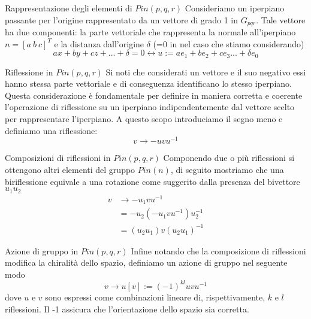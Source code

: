 \begin{frame}{Rappresentazione degli elementi di \(Pin(p,q,r)\)}
   Consideriamo un iperpiano passante per l’origine rappresentato da un vettore di grado 1 in \(G_{pqr}\). 
   Tale vettore ha due componenti: la parte vettoriale che rappresenta la normale all’iperpiano \(n=[a\ b\ c]^{T}\) e la distanza dall’origine \(\delta\) (=0 in nel caso che stiamo considerando)
   \[
      ax+by+cz+...+\delta =0 \leftrightarrow u:= ae_1+be_2+ce_3...+\delta e_0
   \]
\end{frame}

\begin{frame}{Riflessione in \(Pin(p,q,r)\)}
   Si noti che considerati un vettore e il suo negativo essi hanno stessa parte vettoriale e di conseguenza identificano lo stesso iperpiano. 
   Questa considerazione è fondamentale per definire in maniera corretta e coerente l’operazione di riflessione su un iperpiano indipendentemente dal vettore scelto per rappresentare l’iperpiano.
   A questo scopo introduciamo il segno meno e definiamo una riflessione:
   \begin{equation}
      v\to -uvu^{-1}
   \end{equation}
\end{frame}

\begin{frame}{Composizioni di riflessioni in \(Pin(p,q,r)\)}
   Componendo due o più riflessioni si ottengono altri elementi del gruppo \(Pin(n)\), di seguito mostriamo che una biriflessione equivale a una rotazione come suggerito dalla presenza del bivettore \(u_{1}u_{2}\)
   \[
   \begin{aligned}
      v &\to -u_1vu^{-1}\\
      &=-u_2(-u_1vu^{-1})u_2^{-1}\\
      &=(u_2u_1)v(u_2u_1)^{-1}
   \end{aligned}
   \]
\end{frame}

\begin{frame}{Azione di gruppo in \(Pin(p,q,r)\)}
   Infine notando che la composizione di riflessioni modifica la chiralità  dello spazio, definiamo un azione di gruppo nel seguente modo
   \begin{equation}
      v \to u[v]:=(-1)^{kl}uvu^{-1}
   \end{equation}
   dove \(u\) e \(v\) sono espressi come combinazioni lineare di, rispettivamente, \(k\) e \(l\) riflessioni. Il -1 assicura che l’orientazione dello spazio sia corretta.
   
\end{frame}

